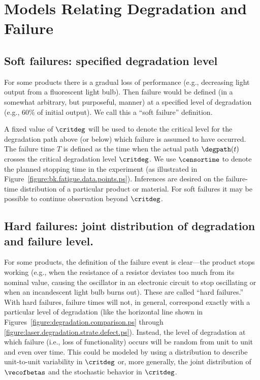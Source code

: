 \section{Models Relating Degradation and Failure}
\label{section:degrad.and.failure}

\subsection{Soft failures: specified degradation level}
For some products there is a gradual loss of performance (e.g.,
decreasing light output from a fluorescent light bulb). Then failure would
be defined (in a somewhat arbitrary, but purposeful, manner)
at a specified level of degradation (e.g., 60\% of initial
output).  We call this a ``soft failure'' definition.

A fixed value of $\critdeg$ will be used to denote the critical
level for the degradation path above (or below) which failure is
assumed to have occurred.  The failure time $T$ is defined as the
time when the actual path $\degpath(t)$ crosses the critical
degradation level $\critdeg$.  We use $\censortime$ to denote the
planned stopping time in the experiment (as illustrated in
Figure~\ref{figure:bk.fatigue.data.points.ps}).  Inferences are
desired on the failure-time distribution of a particular product or
material. For soft failures it may be possible to continue observation
beyond $\critdeg$.

\subsection{Hard failures: joint distribution of 
degradation and failure level.} For some products, the definition of the
failure event is clear---the product stops working (e.g., when the
resistance of a resistor deviates too much from its nominal value,
causing the oscillator in an electronic circuit to stop oscillating or
when an incandescent light bulb burns out).  These are called ``hard
failures.''
With hard failures, failure times will not, in general, correspond
exactly with a particular level of degradation (like the horizontal
line shown in Figures~\ref{figure:degradation.comparison.ps} through
\ref{figure:laser.degradation.strate.defect.ps}). Instead, the
level of degradation at which failure (i.e., loss of functionality)
occurs will be random from unit to unit and even over time.  This
could be modeled by using a distribution to describe unit-to-unit
variability in $\critdeg$ or, more generally, the joint distribution of
$\vecofbetas$ and the stochastic behavior in $\critdeg$.

